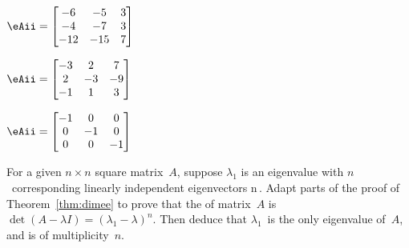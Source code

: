 \begin{exercise}
\begin{parts}
\item \(\eAii=\begin{bmatrix} -6 & -5 & 3
\\-4 & -7 & 3
\\-12 & -15 & 7 \end{bmatrix}\)

\item \(\eAii=\begin{bmatrix} -3 & 2 & 7
\\2 & -3 & -9
\\-1 & 1 & 3 \end{bmatrix}\)

\item \(\eAii=\begin{bmatrix} -1 & 0 & 0
\\0 & -1 & 0
\\0 & 0 & -1 \end{bmatrix}\)


\end{parts}
\end{exercise}







\begin{exercise} \label{ex:dimme} 
For a given \(n\times n\) square matrix~\(A\), suppose \(\lambda_1\) is an eigenvalue with \(n\)~corresponding linearly independent eigenvectors \hlist\pv n\,.  
Adapt parts of the proof of Theorem~\ref{thm:dimee} to prove that the  of matrix~\(A\) is \(\det(A-\lambda I)=(\lambda_1-\lambda)^n\). 
Then deduce that \(\lambda_1\)~is the only eigenvalue of~\(A\), and is of multiplicity~\(n\).
\end{exercise}




